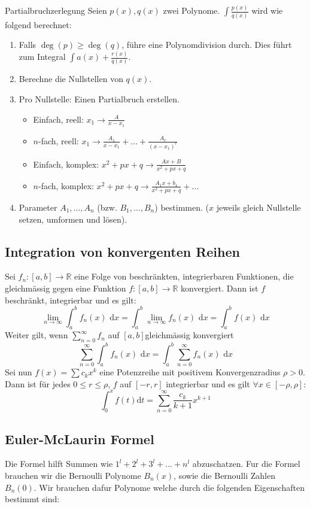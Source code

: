 \documentclass[a4paper,8pt]{extarticle}
\def\limn{\lim_{n\to \infty}}
\def\R{\mathbb{R}}
\def\dx{\text{ d}x}
\begin{document}
\begin{mainbox}{Partialbruchzerlegung}
 Seien $p(x), q(x)$ zwei Polynome. $\int \frac{p(x)}{q(x)}$ wird wie folgend berechnet:
 \begin{enumerate}
  \item Falls $\deg(p) \ge \deg(q)$, führe eine Polynomdivision durch. Dies führt zum Integral $\int a(x) + \frac{r(x)}{q(x)}$.
  \item Berechne die Nullstellen von $q(x)$.
  \item Pro Nullstelle: Einen Partialbruch erstellen.
  \begin{itemize}
   \item Einfach, reell: $x_1 \to \frac{A}{x - x_1}$
   \item $n$-fach, reell: $x_1 \to \frac{A_1}{x - x_1} + \ldots + \frac{A_r}{(x-x_1)^r}$ 
   \item Einfach, komplex: $x^2 + px + q \to \frac{Ax + B} {x^2 + px + q}$
   \item $n$-fach, komplex: $x^2 + px + q \to \frac{A_1x+b_1}{x^2+px+q} + \ldots$
  \end{itemize}
  \item Parameter $A_1, \ldots, A_n$ (bzw. $B_1, \ldots, B_n$) bestimmen. ($x$ jeweils gleich Nullstelle setzen, umformen und lösen).

 \end{enumerate}

\end{mainbox}

\subsection{Integration von konvergenten Reihen}
Sei $f_n : [a, b]\to \R$ eine Folge von beschränkten, integrierbaren Funktionen, die gleichmässig gegen eine Funktion $f: [a, b] \to \R$ konvergiert. Dann ist $f$ beschränkt, integrierbar und es gilt: $$\limn \int_a^b f_n(x)\dx = \int_a^b \limn f_n(x)\dx = \int_a^b f(x)\dx$$
Weiter gilt, wenn $\sum_{n=0}^\infty f_n$ auf $[a, b]$gleichmässig konvergiert $$\sum_{n=0}^\infty \int_a^b f_n(x)\dx = \int_a^b \sum_{n=0}^\infty f_n(x)\dx$$
Sei nun $f(x) = \sum c_kx^k$ eine Potenzreihe mit positivem Konvergenzradius $\rho >0$. Dann ist für jedes $0 \leq r \leq \rho$, $f$ auf $[-r, r]$ integrierbar und es gilt $\forall x \in [-\rho, \rho]$: $$\int_0^x f(t)\text{d}t = \sum_{n=0}^\infty \frac{c_k}{k+1}x^{k+1}$$

\subsection{Euler-McLaurin Formel}
Die Formel hilft Summen wie $1^l + 2^l + 3^l + ... + n^l$ abzuschatzen.
Fur die Formel brauchen wir die Bernoulli Polynome $B_n(x)$,
sowie die Bernoulli Zahlen $B_n(0)$.
Wir brauchen dafur Polynome welche durch die folgenden
Eigenschaften bestimmt sind:
\end{document}
